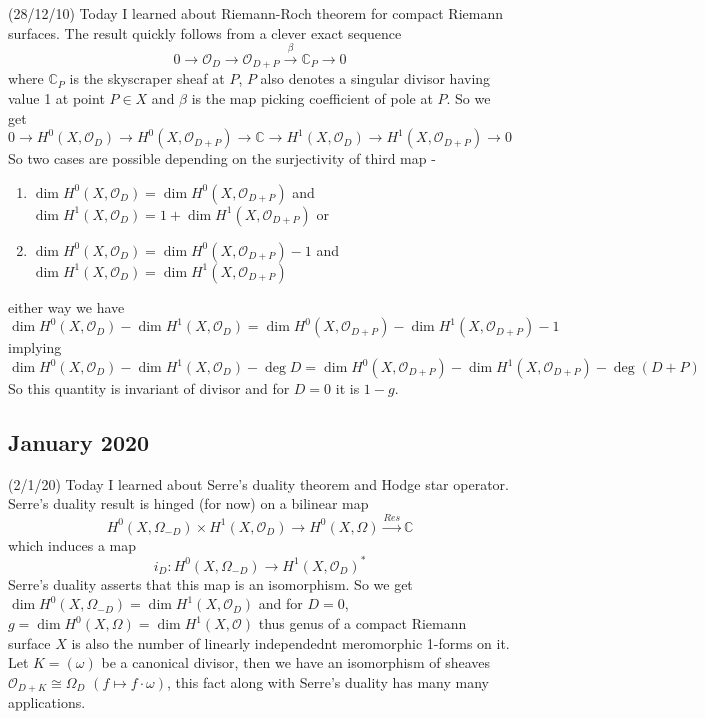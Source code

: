 \documentclass[12pt,a4paper]{article}
\begin{document}
(28/12/10) Today I learned about Riemann-Roch theorem for compact Riemann surfaces. The result quickly follows from a clever exact sequence \[ 0 \to \mathcal{O}_D \to \mathcal{O}_{D+P} \xrightarrow{\beta} \mathbb{C}_P \to 0 \] where $\mathbb{C}_P$ is the skyscraper sheaf at $ P $, $ P $ also denotes a singular divisor having value 1 at point $P\in X$ and $\beta$ is the map picking coefficient of pole at $P$. So we get \[ 0 \to H^0(X,\mathcal{O}_D) \to H^0(X,\mathcal{O}_{D+P}) \to \mathbb{C} \to H^1(X,\mathcal{O}_D) \to H^1(X,\mathcal{O}_{D+P}) \to 0\] So two cases are possible depending on the surjectivity of third map -  \begin{enumerate}
	\item $\dim H^0(X,\mathcal{O}_D) = \dim H^0(X,\mathcal{O}_{D+P})$ and $\dim H^1(X,\mathcal{O}_D) = 1+ \dim H^1(X,\mathcal{O}_{D+P})$ or 
	\item $\dim H^0(X,\mathcal{O}_D) = \dim H^0(X,\mathcal{O}_{D+P}) - 1$ and $\dim H^1(X,\mathcal{O}_D) = \dim H^1(X,\mathcal{O}_{D+P})$
\end{enumerate}
either way we have $$\dim H^0(X,\mathcal{O}_D) - \dim H^1(X,\mathcal{O}_D) = \dim H^0(X,\mathcal{O}_{D+P}) - \dim H^1(X,\mathcal{O}_{D+P}) - 1$$ implying 
$$ \dim H^0(X,\mathcal{O}_D) - \dim H^1(X,\mathcal{O}_D) - \deg D = \dim H^0(X,\mathcal{O}_{D+P}) - \dim H^1(X,\mathcal{O}_{D+P}) - \deg (D+P)$$
So this quantity is invariant of divisor and for $D=0$ it is $1-g$.

\subsection*{January 2020}

\quad (2/1/20) Today I learned about Serre's duality theorem and Hodge star operator. Serre's duality result is hinged (for now) on a bilinear map \[ H^0(X,\Omega_{-D}) \times H^1(X,\mathcal{O}_D) \to  H^0(X,\Omega) \xrightarrow{Res} \mathbb{C} \] which induces a map \[ i_D : H^0(X,\Omega_{-D} )\to H^1(X,\mathcal{O}_D)^*\]
Serre's duality asserts that this map is an isomorphism. So we get $ \dim  H^0(X,\Omega_{-D})=\dim H^1(X,\mathcal{O}_D)$ and for $D=0$, $g= \dim  H^0(X,\Omega)=\dim H^1(X,\mathcal{O})$ thus genus of a compact Riemann surface $X$ is also the number of linearly independednt meromorphic 1-forms on it. Let $K=(\omega)$ be a canonical divisor, then we have an isomorphism of sheaves $\mathcal{O}_{D+K} \cong \Omega_D$ $(f\mapsto f\cdot \omega)$, this fact along with Serre's duality has many many applications. 
\end{document}
